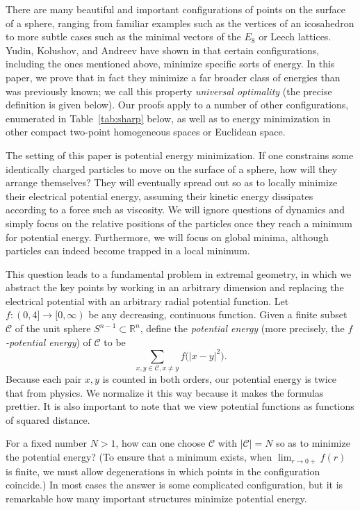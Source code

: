 \documentclass{jams-l}
\theoremstyle{plain}
\numberwithin{theorem}{section}
\theoremstyle{definition}
\numberwithin{equation}{section}
\newcommand{\R}{{\mathbb R}}
\newcommand{\CodeS}{\mathcal{C}}
\newcommand{\co}{\colon}
\begin{document}
There are many beautiful and important configurations of points on
the surface of a sphere, ranging from familiar examples such as
the vertices of an icosahedron to more subtle cases such as the
minimal vectors of the $E_8$ or Leech lattices.  Yudin, Kolushov,
and Andreev have shown in \cite{Y,KY1,KY2,A1,A2} that certain
configurations, including the ones mentioned above, minimize
specific sorts of energy.  In this paper, we prove that in fact
they minimize a far broader class of energies than was previously
known;  we call this property \textit{universal optimality\/} (the
precise definition is given below).  Our proofs apply to a number
of other configurations, enumerated in Table~\ref{tab:sharp}
below, as well as to energy minimization in other compact
two-point homogeneous spaces or Euclidean space.

The setting of this paper is potential energy minimization. If one
constrains some identically charged particles to move on the
surface of a sphere, how will they arrange themselves?  They will
eventually spread out so as to locally minimize their electrical
potential energy, assuming their kinetic energy dissipates
according to a force such as viscosity. We will ignore questions
of dynamics and simply focus on the relative positions of the
particles once they reach a minimum for potential energy.
Furthermore, we will focus on global minima, although particles
can indeed become trapped in a local minimum.

This question leads to a fundamental problem in extremal geometry,
in which we abstract the key points by working in an arbitrary
dimension and replacing the electrical potential with an arbitrary
radial potential function.  Let $f \co (0,4] \to [0,\infty)$ be
any decreasing, continuous function.  Given a finite subset
$\CodeS$ of the unit sphere $S^{n-1} \subset \R^n$, define the
\textit{potential energy\/} (more precisely, the
\textit{$f$-potential energy}\/) of $\CodeS$ to be
$$
\sum_{x,y \in \CodeS, x \ne y} f\big(|x-y|^2\big).
$$
Because each pair $x,y$ is counted in both orders, our potential
energy is twice that from physics.  We normalize it this way
because it makes the formulas prettier.  It is also important to
note that we view potential functions as functions of squared
distance.

For a fixed number $N>1$, how can one choose $\CodeS$ with
$|\CodeS|=N$ so as to minimize the potential energy?  (To ensure
that a minimum exists, when $\lim_{r \to 0+}f(r)$ is finite, we
must allow degenerations in which points in the configuration
coincide.) In most cases the answer is some complicated
configuration, but it is remarkable how many important structures
minimize potential energy.
\end{document}
